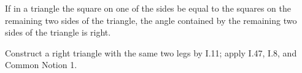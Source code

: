 \begin{claim}
\label{prop:I.48}
If in a triangle the square on one of the sides be equal to the
squares on the remaining two sides of the triangle, the angle
contained by the remaining two sides of the triangle is right.
\end{claim}
\begin{evidence}[Proof of I.48]
\label{ev:I.48}
Construct a right triangle with the same two legs by I.11; apply
I.47, I.8, and Common Notion 1.
\end{evidence}
